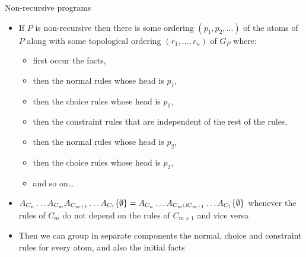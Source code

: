 \begin{frame}{Non-recursive programs}
  \begin{itemize}
    \item If $P$ is non-recursive then there is
          some ordering $(p_1, p_2, \ldots)$ of the atoms of $P$ along with
          some topological ordering
          $(r_1, \ldots, r_n)$ of $G_P$ where:
    \begin{itemize}
      \item first occur the facts, 
      \item then the normal rules whose head is $p_1$, 
      \item then the choice rules whose head is $p_1$, 
      \item then the constraint rules that are independent of the rest of the rules,
      \item then the normal rules whose head is $p_2$, 
      \item then the choice rules whose head is $p_2$, 
      \item and so on\ldots
    \end{itemize}
    \item $A_{C_n}\ldots A_{C_m}A_{C_{m+1}}\ldots A_{C_1}\{\emptyset\} =
           A_{C_n}\ldots A_{C_m \cup C_{m+1}}\ldots A_{C_1}\{\emptyset\}$ whenever 
            the rules of $C_m$ do not depend on the rules of $C_{m+1}$ and vice versa
    \item Then we can group in separate components
          the normal, choice and constraint rules for every atom, and also the initial facts
  \end{itemize}



\end{frame}

